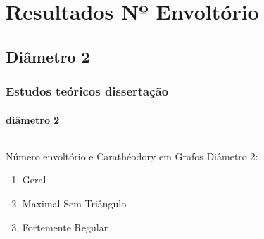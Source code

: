\section{Resultados Nº Envoltório}
\subsection{Diâmetro 2}

\begin{frame}
\frametitle{Estudos teóricos dissertação}
\framesubtitle{diâmetro 2}
\begin{columns}[T]
 \begin{column}{.5\textwidth}
Número envoltório e Carathéodory em Grafos Diâmetro 2:
\begin{enumerate}
\item{Geral}
\item{Maximal Sem Triângulo}
\item{Fortemente Regular}
\end{enumerate}
\end{column}
\begin{column}{.5\textwidth}
\end{column}
\end{columns}
\end{frame}


